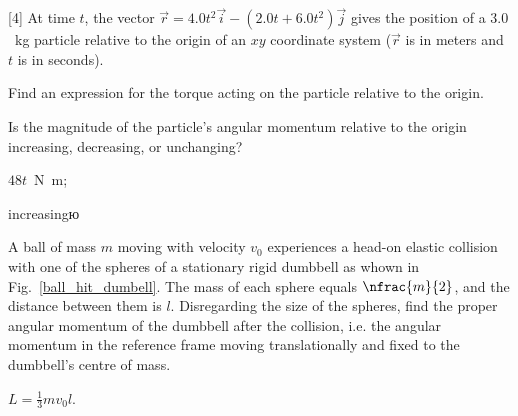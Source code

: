 \begin{problem}\correct{6.5cm}[4]%
	At time $t$, the vector $\vec r = 4.0t^2 \vec i - (2.0 t + 6.0t^2 ) \vec j$ gives the position of a $3.0$~kg particle relative to the origin of an $xy$ coordinate system ($\vec r$ is in meters and $t$ is in seconds). 
	\begin{enumerate*}[label=(\alph*)]
		\item Find an expression for the torque acting on the particle relative to the origin. 
		\item Is the magnitude of the particle’s angular momentum relative to the origin increasing, decreasing, or unchanging?
	\end{enumerate*}
	\begin{solution}
		\begin{enumerate*}[label=(\alph*)]
			\item $48t$~\si{\newton\meter}; 
			\item increasingю
		\end{enumerate*}
	\end{solution}
\end{problem}

\begin{problem}\label{prb:ball_hit_dumbell}
	A ball of mass $m$ moving with velocity $v_0$ experiences a head-on elastic collision with one of the spheres of a stationary rigid dumbbell as whown in Fig.~\ref{ball_hit_dumbell}. The mass of each sphere equals $\nfrac{m}{2}$, and the distance between them is $l$. Disregarding the size of the spheres, find the proper angular momentum of the dumbbell after the collision, i.e. the angular momentum in the reference frame moving translationally and fixed to the dumbbell's centre of mass.
	\begin{solution}
		$L = \frac13 mv_0l$.
	\end{solution}
\end{problem}


